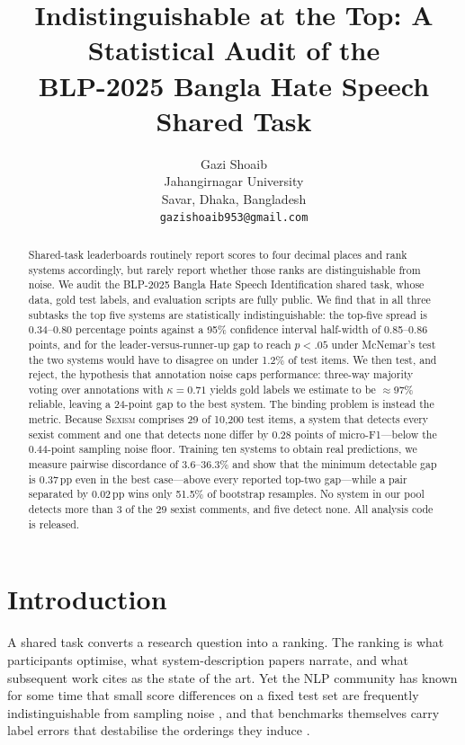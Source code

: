 \documentclass[11pt]{article}
\title{Indistinguishable at the Top: A Statistical Audit of the\\
       BLP-2025 Bangla Hate Speech Shared Task}
\author{Gazi Shoaib \\
  Jahangirnagar University \\
  Savar, Dhaka, Bangladesh \\
  \texttt{gazishoaib953@gmail.com}}
\begin{document}
\maketitle

\renewcommand{\thefootnote}{\arabic{footnote}}

\begin{abstract}
Shared-task leaderboards routinely report scores to four decimal places and rank
systems accordingly, but rarely report whether those ranks are distinguishable
from noise. We audit the BLP-2025 Bangla Hate Speech Identification shared task,
whose data, gold test labels, and evaluation scripts are fully public. We find
that in all three subtasks the top five systems are statistically
indistinguishable: the top-five spread is 0.34--0.80 percentage points against a
95\% confidence interval half-width of 0.85--0.86 points, and for the
leader-versus-runner-up gap to reach $p<.05$ under McNemar's test the two systems
would have to disagree on under 1.2\% of test items. We then test, and reject,
the hypothesis that annotation noise caps performance: three-way majority voting
over annotations with $\kappa=0.71$ yields gold labels we estimate to be
$\approx$97\% reliable, leaving a 24-point gap to the best system. The binding
problem is instead the metric. Because \textsc{Sexism} comprises 29 of 10{,}200
test items, a system that detects every sexist comment and one that detects none
differ by 0.28 points of micro-F1---below the 0.44-point sampling noise floor.
Training ten systems to obtain real predictions, we measure pairwise discordance
of 3.6--36.3\% and show that the minimum detectable gap is 0.37\,pp even in the
best case---above every reported top-two gap---while a pair separated by
0.02\,pp wins only 51.5\% of bootstrap resamples. No system in our pool detects
more than 3 of the 29 sexist comments, and five detect none. All analysis code is
released.
\end{abstract}

\section{Introduction}
\label{sec:intro}

A shared task converts a research question into a ranking. The ranking is what
participants optimise, what system-description papers narrate, and what
subsequent work cites as the state of the art. Yet the NLP community has known
for some time that small score differences on a fixed test set are frequently
indistinguishable from sampling noise
\citep{reimers2017reporting,dror2018hitchhiker,card2020power}, and that
benchmarks themselves carry label errors that destabilise the orderings they
induce \citep{northcutt2021labelerrors,bowman2021benchmarking}.
\end{document}
